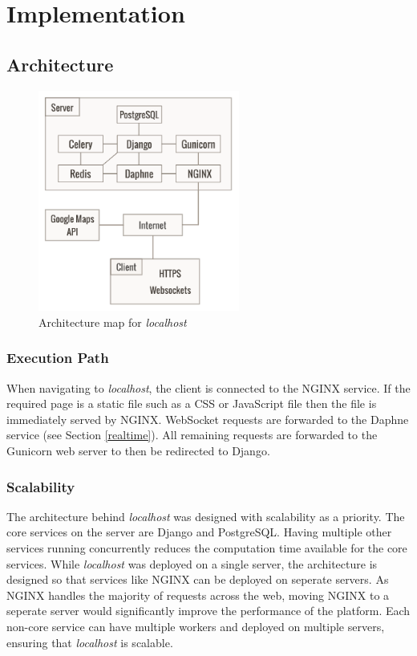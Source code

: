 \section{Implementation}
\subsection{Architecture}

\begin{figure}[!h]
\includegraphics[width=250px]{assets/architecture.png}
\caption{Architecture map for \emph{localhost}}
\label{fig:architecture_map}
\end{figure}

\subsubsection{Execution Path}

When navigating to \emph{localhost}, the client is connected to the NGINX
service. If the required page is a static file such as a CSS or JavaScript
file then the file is immediately served by NGINX. WebSocket requests are
forwarded to the Daphne service (see Section \ref{realtime}). All remaining
requests are forwarded to the Gunicorn web server to then be redirected to
Django.

\subsubsection{Scalability}

The architecture behind \emph{localhost} was designed with scalability as a
priority. The core services on the server are Django and PostgreSQL.
Having multiple other services running concurrently reduces the computation
time available for the core services. While \emph{localhost} was deployed on
a single server, the architecture is designed so that services like NGINX can
be deployed on seperate servers. As NGINX handles the majority of requests
across the web, moving NGINX to a seperate server would significantly improve
the performance of the platform. Each non-core service can have multiple
workers and deployed on multiple servers, ensuring that \emph{localhost} is
scalable.

